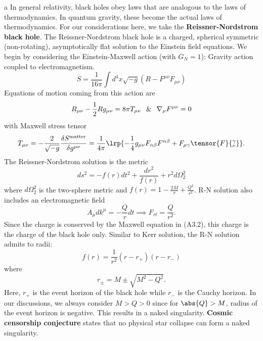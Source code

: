     a In general relativity, black holes obey laws that are analogous to the laws of thermodynamics. In quantum gravity, these become the actual laws of thermodynamics. For our considerations here, we take the \textbf{Reissner-Nordstrom black hole}. The Reissner-Nordstrom black hole is a charged, spherical symmetric (non-rotating), asymptotically flat solution to the Einstein field equations. We begin by considering the Einstein-Maxwell action (with $G_N = 1$): Gravity action coupled to electromagnetism.
    \begin{equation}
        S = \frac{1}{16\pi}\int d^4x\sqrt{-g}(R-F^{\mu\nu}F_{\mu\nu})
    \end{equation}
    Equations of motion coming from this action are
    \begin{equation}
        R_{\mu\nu}-\frac{1}{2}Rg_{\mu\nu}=8\pi T_{\mu\nu} \hspace{0.25cm}\&\hspace{0.25cm}\nabla_\mu F^{\mu\nu}=0
    \end{equation}
    with Maxwell stress tensor
    \begin{equation}
        T_{\mu\nu}=-\frac{2}{\sqrt{-g}}\frac{\delta S^\mathrm{matter}}{\delta g^{\mu\nu}} = \frac{1}{4\pi}\lrp{-\frac{1}{4}g_{\mu\nu}F_{\alpha\beta}F^{\alpha\beta}+F_{\mu\gamma}\tensor{F}{_\nu^\gamma}}.
    \end{equation}
    The Reissner-Nordstrom solution is the metric
    \begin{equation}
        ds^2 = -f(r)dt^2+\frac{dr^2}{f(r)}+r^2d\Omega_2^2
    \end{equation}
    where $d\Omega_2^2$ is the two-sphere metric and $f(r)=1-\frac{2M}{r}+\frac{Q^2}{r^2}$. R-N solution also includes an electromagnetic field
    \begin{equation}
        A_\mu dk^\mu = -\frac{Q}{r}dt \implies F_{rt}=\frac{Q}{r^2}.
    \end{equation}
    Since the charge is conserved by the Maxwell equation in (A3.2), this charge is the charge of the black hole only. Similar to Kerr solution, the R-N solution admits to radii:
    \begin{equation}
        f(r) = \frac{1}{r^2}(r-r_+)(r-r_-)
    \end{equation}
    where
    \begin{equation}
        r_\pm = M \pm \sqrt{M^2-Q^2}.
    \end{equation}
    Here, $r_+$ is the event horizon of the black hole while $r_-$ is the Cauchy horizon. In our discussions, we always consider $M>Q>0$ since for $\abs{Q}>M$, radius of the event horizon is negative. This results in a naked singularity. \textbf{Cosmic censorship conjecture} states that no physical star collapse can form a naked singularity. \\
